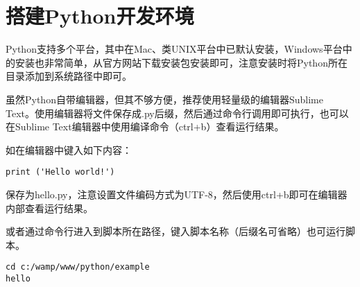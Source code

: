 \section{搭建Python开发环境}

Python支持多个平台，其中在Mac、类UNIX平台中已默认安装，Windows平台中的安装也非常简单，从官方网站下载安装包安装即可，注意安装时将Python所在目录添加到系统路径中即可。

虽然Python自带编辑器，但其不够方便，推荐使用轻量级的编辑器Sublime Text。使用编辑器将文件保存成.py后缀，然后通过命令行调用即可执行，也可以在Sublime Text编辑器中使用编译命令（ctrl+b）查看运行结果。

如在编辑器中键入如下内容：

\begin{lstlisting}
print ('Hello world!')
\end{lstlisting}

保存为hello.py，注意设置文件编码方式为UTF-8，然后使用ctrl+b即可在编辑器内部查看运行结果。

或者通过命令行进入到脚本所在路径，键入脚本名称（后缀名可省略）也可运行脚本。

\begin{lstlisting}
cd c:/wamp/www/python/example
hello
\end{lstlisting}




